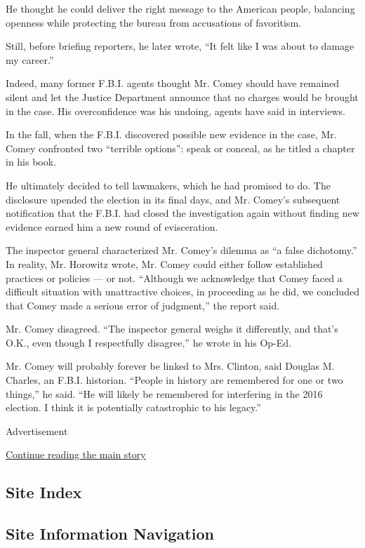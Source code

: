 He thought he could deliver the right message to the American people,
balancing openness while protecting the bureau from accusations of
favoritism.

Still, before briefing reporters, he later wrote, ``It felt like I was
about to damage my career.''

Indeed, many former F.B.I. agents thought Mr. Comey should have remained
silent and let the Justice Department announce that no charges would be
brought in the case. His overconfidence was his undoing, agents have
said in interviews.

In the fall, when the F.B.I. discovered possible new evidence in the
case, Mr. Comey confronted two ``terrible options'': speak or conceal,
as he titled a chapter in his book.

He ultimately decided to tell lawmakers, which he had promised to do.
The disclosure upended the election in its final days, and Mr. Comey's
subsequent notification that the F.B.I. had closed the investigation
again without finding new evidence earned him a new round of
evisceration.

The inspector general characterized Mr. Comey's dilemma as ``a false
dichotomy.'' In reality, Mr. Horowitz wrote, Mr. Comey could either
follow established practices or policies --- or not. ``Although we
acknowledge that Comey faced a difficult situation with unattractive
choices, in proceeding as he did, we concluded that Comey made a serious
error of judgment,'' the report said.

Mr. Comey disagreed. ``The inspector general weighs it differently, and
that's O.K., even though I respectfully disagree,'' he wrote in his
Op-Ed.

Mr. Comey will probably forever be linked to Mrs. Clinton, said Douglas
M. Charles, an F.B.I. historian. ``People in history are remembered for
one or two things,'' he said. ``He will likely be remembered for
interfering in the 2016 election. I think it is potentially catastrophic
to his legacy.''

Advertisement

\protect\hyperlink{after-bottom}{Continue reading the main story}

\hypertarget{site-index}{%
\subsection{Site Index}\label{site-index}}

\hypertarget{site-information-navigation}{%
\subsection{Site Information
Navigation}\label{site-information-navigation}}

